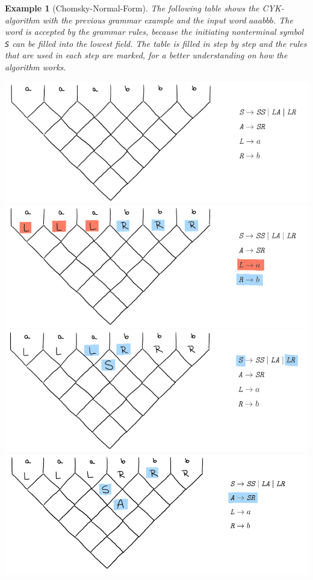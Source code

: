 \documentclass[a4paper, 11pt]{article}
\newtheorem*{example*}{Example}
\begin{document}
\begin{example*}[Chomsky-Normal-Form]
The following table shows the CYK-algorithm with the previous grammar example and the input word $aaabbb$. 
The word is accepted by the grammar rules, because the initiating nonterminal symbol \textit{\texttt{S}} can be filled into the lowest field. The table is filled in step by step and the rules that are used in each step are marked, for a better understanding on how the algorithm works. \cite{cyk_online_alg}
\ \\

\begin{center}
\includegraphics[scale=0.9]{images/7.png} \\
\includegraphics[scale=0.9]{images/6.png} \\
\includegraphics[scale=0.9]{images/5.png} \\
\includegraphics[scale=0.9]{images/4.png} \\

\end{center}
\end{example*}
\end{document}
